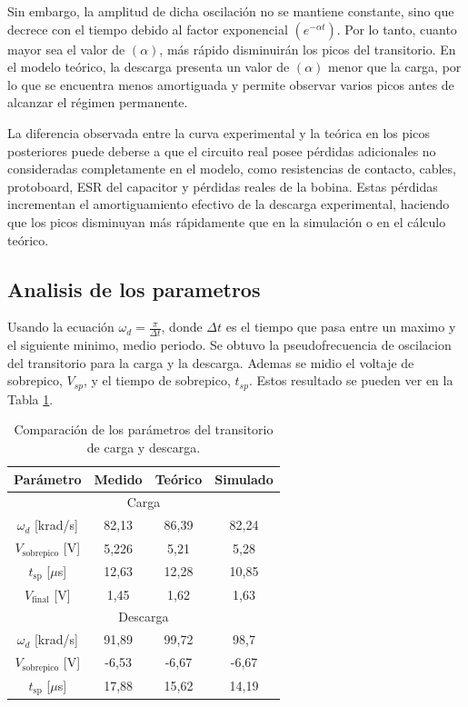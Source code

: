 Sin embargo, la amplitud de dicha oscilación no se mantiene constante, sino que decrece con el tiempo debido al factor exponencial $(e^{-\alpha  t})$. Por lo tanto, cuanto mayor sea el valor de $(\alpha)$, más rápido disminuirán los picos del transitorio. En el modelo teórico, la descarga presenta un valor de $(\alpha)$ menor que la carga, por lo que se encuentra menos amortiguada y permite observar varios picos antes de alcanzar el régimen permanente.

La diferencia observada entre la curva experimental y la teórica en los picos posteriores puede deberse a que el circuito real posee pérdidas adicionales no consideradas completamente en el modelo, como resistencias de contacto, cables, protoboard, ESR del capacitor y pérdidas reales de la bobina. Estas pérdidas incrementan el amortiguamiento efectivo de la descarga experimental, haciendo que los picos disminuyan más rápidamente que en la simulación o en el cálculo teórico.

\subsection{Analisis de los parametros}
Usando la ecuación $\omega_d = \frac{\pi}{\Delta t}$, donde $\Delta t $ es el tiempo que pasa entre un maximo y el siguiente minimo, medio periodo. Se obtuvo la pseudofrecuencia de oscilacion del transitorio para la carga y la descarga. 
Ademas se midio el voltaje de sobrepico, $V_{sp}$, y el tiempo de sobrepico, $t_{sp}$. Estos resultado se pueden ver en la Tabla \ref{tab:transitorio_parametros}. 

\begin{table}[H]
    \centering
    \begin{tabular}{|c|c|c|c|}
        \hline
        Parámetro & Medido & Teórico & Simulado \\
        \hline
        \multicolumn{4}{|c|}{Carga} \\
        \hline
        $\omega_d$ [krad/s] & 82,13 & 86,39 & 82,24 \\
        $V_{\text{sobrepico}}$ [V] & 5,226& 5,21 & 5,28 \\
        $t_{\text{sp}}$ [$\mu$s] & 12,63 & 12,28 & 10,85 \\
        $V_{\text{final}}$ [V] & 1,45 & 1,62 & 1,63 \\
        \hline
        \multicolumn{4}{|c|}{Descarga} \\
        \hline
        $\omega_d$ [krad/s] & 91,89 & 99,72 & 98,7 \\
        $V_{\text{sobrepico}}$ [V] & -6,53 & -6,67 & -6,67 \\
        $t_{\text{sp}}$ [$\mu$s] & 17,88 & 15,62 & 14,19 \\
        \hline
    \end{tabular}
    \caption{Comparación de los parámetros del transitorio de carga y descarga.}
    \label{tab:transitorio_parametros}
\end{table}

